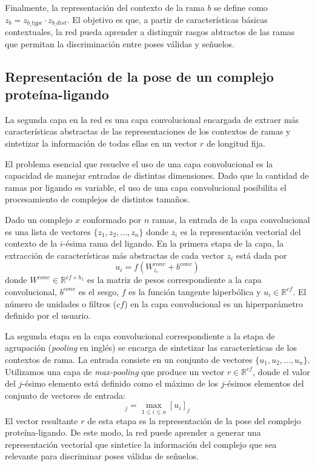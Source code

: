 Finalmente, la representación del contexto de la rama $b$ se define
como $z_b = z_{b\_type} \cdot z_{b\_dist}$. El objetivo es que, a
partir de características básicas contextuales, la red pueda aprender
a distinguir rasgos abtractos de las ramas que permitan la
discriminación entre poses válidas y señuelos.

\subsection{Representación de la pose de un complejo proteína-ligando}

La segunda capa en la red es una capa convolucional encargada de
extraer más características abstractas de las representaciones de los
contextos de ramas y sintetizar la información de todas ellas en un
vector $r$ de longitud fija.

El problema esencial que resuelve el uso de una capa convolucional es
la capacidad de manejar entradas de distintas dimensiones. Dado que la
cantidad de ramas por ligando es variable, el uso de una capa
convolucional posibilita el procesamiento de complejos de distintos
tamaños.

Dado un complejo $x$ conformado por $n$ ramas, la entrada de la capa
convolucional es una lista de vectores $\{z_1, z_2, ..., z_n\}$ donde
$z_i$ es la representación vectorial del contexto de la $i$-ésima rama
del ligando. En la primera etapa de la capa, la extracción de
características más abstractas de cada vector $z_i$ está dada por
\begin{equation}
  u_i = f(W^{conv}_{z_i} + b^{conv})
\end{equation}
donde $W^{conv} \in \mathbb{R}^{cf \times h_1}$ es la matriz de pesos
correspondiente a la capa convolucional, $b^{conv}$ es el sesgo, $f$
es la función tangente hiperbólica y $u_i \in \mathbb{R}^{cf}$. El
número de unidades o filtros ($cf$) en la capa convolucional es un
hiperparámetro definido por el usuario.

La segunda etapa en la capa convolucional correspondiente a la etapa
de agrupación (\textit{pooling} en inglés) se encarga de sintetizar
las características de los contextos de rama. La entrada consiste en
un conjunto de vectores $\{u_1, u_2, ..., u_n\}$. Utilizamos una capa
de \textit{max-pooling} que produce un vector $r \in \mathbb{R}^{cf}$,
donde el valor del $j$-ésimo elemento está definido como el máximo de
los $j$-ésimos elementos del conjunto de vectores de entrada:
\begin{equation}
  [r]_j = \max_{1 \leq i \leq n} [u_i]_j
\end{equation}
El vector resultante $r$ de esta etapa es la representación de la pose
del complejo proteína-ligando. De este modo, la red puede aprender a
generar una representación vectorial que sintetice la información del
complejo que sea relevante para discriminar poses válidas de señuelos.

